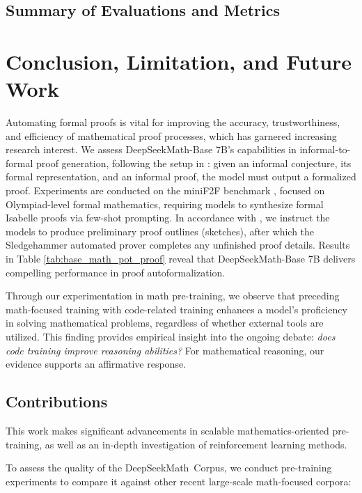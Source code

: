 \subsection{Summary of Evaluations and Metrics}

\section{Conclusion, Limitation, and Future Work} 

Automating formal proofs is vital for improving the accuracy, trustworthiness, and efficiency of mathematical proof processes, which has garnered increasing research interest. We assess DeepSeekMath-Base 7B’s capabilities in informal-to-formal proof generation, following the setup in \citep{dsp_proof}: given an informal conjecture, its formal representation, and an informal proof, the model must output a formalized proof. Experiments are conducted on the miniF2F benchmark \citep{minif2f}, focused on Olympiad-level formal mathematics, requiring models to synthesize formal Isabelle proofs via few-shot prompting. In accordance with \cite{dsp_proof}, we instruct the models to produce preliminary proof outlines (sketches), after which the Sledgehammer automated prover \citep{sledgehammer} completes any unfinished proof details. Results in Table \ref{tab:base_math_pot_proof} reveal that DeepSeekMath-Base 7B delivers compelling performance in proof autoformalization.

    \item Through our experimentation in math pre-training, we observe that preceding math-focused training with code-related training enhances a model’s proficiency in solving mathematical problems, regardless of whether external tools are utilized. This finding provides empirical insight into the ongoing debate: \textit{does code training improve reasoning abilities?} For mathematical reasoning, our evidence supports an affirmative response.

\subsection{Contributions}
This work makes significant advancements in scalable mathematics-oriented pre-training, as well as an in-depth investigation of reinforcement learning methods.

To assess the quality of the DeepSeekMath~Corpus, we conduct pre-training experiments to compare it against other recent large-scale math-focused corpora:


